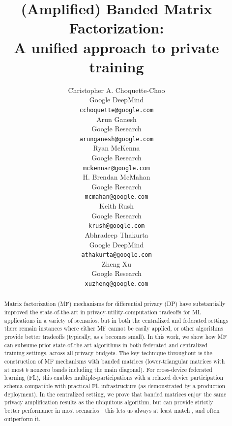 \documentclass{article}
\title{%
(Amplified) Banded Matrix Factorization:\\
A unified approach to private training
}
\author{
Christopher A. Choquette-Choo \\
Google DeepMind \\
\texttt{cchoquette@google.com} \\
\And
Arun Ganesh \\
Google Research \\
\texttt{arunganesh@google.com} \\
\And
Ryan McKenna \\
Google Research \\
\texttt{mckennar@google.com} \\
\And
H. Brendan McMahan \\
Google Research \\
\texttt{mcmahan@google.com} \\
\And
Keith Rush \\
Google Research \\
\texttt{krush@google.com} \\
\And
Abhradeep Thakurta \\
Google DeepMind \\
\texttt{athakurta@google.com} \\
\And
Zheng Xu \\
Google Research \\
\texttt{xuzheng@google.com} \\
}
\begin{document}
\maketitle
\begin{abstract}
%
Matrix factorization (MF) mechanisms for differential privacy (DP) have substantially improved the state-of-the-art in privacy-utility-computation tradeoffs for ML applications in a variety of scenarios, but in both the centralized and federated settings there remain instances where either MF cannot be easily applied, or other algorithms provide better tradeoffs (typically, as $\epsilon$ becomes small).
In this work, we show how MF can subsume prior state-of-the-art algorithms in both federated and centralized training settings, across all privacy budgets. The key technique throughout is the construction of MF mechanisms with banded matrices (lower-triangular matrices with at most $\hat{b}$ nonzero bands including the main diagonal). For cross-device federated learning (FL), this enables multiple-participations with a relaxed device participation schema compatible with practical FL infrastructure (as demonstrated by a production deployment).  In the centralized setting, we prove that banded matrices enjoy the same privacy amplification results as the ubiquitous \dpsgd algorithm, but can provide strictly better performance  in most scenarios---this lets us always at least match \dpsgd, and often outperform it.%
\end{abstract}
\end{document}
